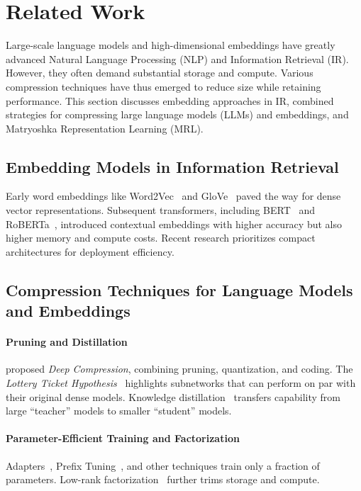 \section{Related Work}
\label{sec:related_work}

Large-scale language models and high-dimensional embeddings have greatly advanced Natural Language Processing (NLP) and Information Retrieval (IR). However, they often demand substantial storage and compute. Various compression techniques have thus emerged to reduce size while retaining performance. This section discusses embedding approaches in IR, combined strategies for compressing large language models (LLMs) and embeddings, and Matryoshka Representation Learning (MRL).

\subsection{Embedding Models in Information Retrieval}
Early word embeddings like Word2Vec~\cite{mikolov2013distributed} and GloVe~\cite{pennington2014glove} paved the way for dense vector representations. Subsequent transformers, including BERT~\cite{devlin2019bert} and RoBERTa~\cite{liu2019roberta}, introduced contextual embeddings with higher accuracy but also higher memory and compute costs. Recent research prioritizes compact architectures for deployment efficiency.

\subsection{Compression Techniques for Language Models and Embeddings}
\paragraph{Pruning and Distillation}
\citet{han2015deep} proposed \emph{Deep Compression}, combining pruning, quantization, and coding. The \emph{Lottery Ticket Hypothesis}~\cite{frankle2019lottery} highlights subnetworks that can perform on par with their original dense models. Knowledge distillation~\cite{hinton2015distilling, sanh2019distilbert, jiao2020tinybert} transfers capability from large “teacher” models to smaller “student” models.

\paragraph{Parameter-Efficient Training and Factorization}
Adapters~\cite{houlsby2019parameter}, Prefix Tuning~\cite{li2021prefix}, and other techniques train only a fraction of parameters. Low-rank factorization~\cite{jaderberg2014speeding, sainath2013low} further trims storage and compute.

